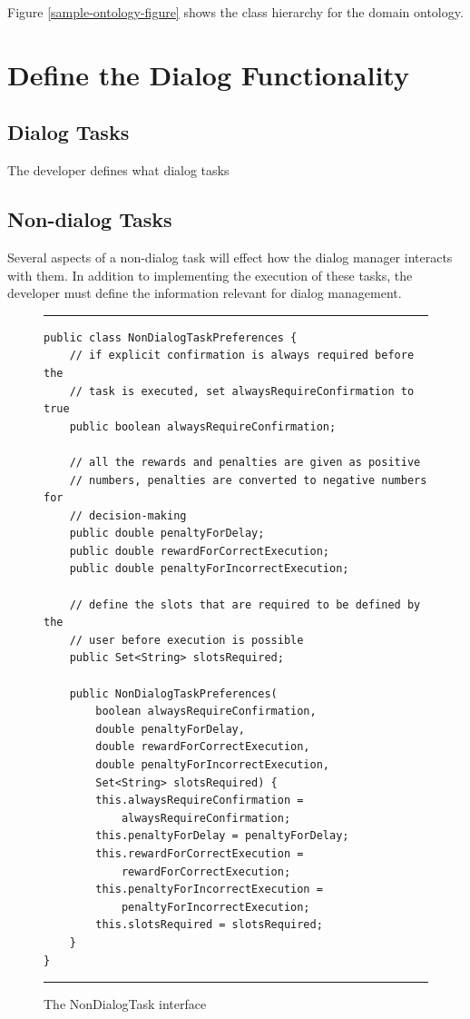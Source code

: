 \documentclass[10pt]{article}
\begin{document}
Figure \ref{sample-ontology-figure} shows the class hierarchy for the domain ontology.

\section {Define the Dialog Functionality} \label{dialog-management-section}

\subsection {Dialog Tasks}
The developer defines what dialog tasks

\subsection {Non-dialog Tasks}
Several aspects of a non-dialog task will effect how the dialog manager interacts with them.
In addition to implementing the execution of these tasks, the developer must define the information relevant for dialog management.


\begin{figure}[ht*]
\centering
\rule{\textwidth}{1pt}
\small
\begin{verbatim}
public class NonDialogTaskPreferences {
    // if explicit confirmation is always required before the 
    // task is executed, set alwaysRequireConfirmation to true
    public boolean alwaysRequireConfirmation;

    // all the rewards and penalties are given as positive 
    // numbers, penalties are converted to negative numbers for
    // decision-making
    public double penaltyForDelay;
    public double rewardForCorrectExecution;
    public double penaltyForIncorrectExecution;

    // define the slots that are required to be defined by the
    // user before execution is possible
    public Set<String> slotsRequired;

    public NonDialogTaskPreferences(
        boolean alwaysRequireConfirmation, 
        double penaltyForDelay, 
        double rewardForCorrectExecution, 
        double penaltyForIncorrectExecution, 
        Set<String> slotsRequired) {
        this.alwaysRequireConfirmation = 
            alwaysRequireConfirmation;
        this.penaltyForDelay = penaltyForDelay;
        this.rewardForCorrectExecution = 
            rewardForCorrectExecution;
        this.penaltyForIncorrectExecution = 
            penaltyForIncorrectExecution;
        this.slotsRequired = slotsRequired;
    }
}
\end{verbatim}
\rule{\textwidth}{1pt}
\caption{The NonDialogTask interface}
\label{NonDialogTaskPreferences-code-figure}
\end{figure}
\end{document}

